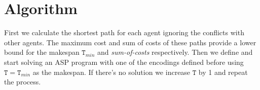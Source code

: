 






\section{Algorithm}
First we calculate the shortest path for each agent ignoring the conflicts with other agents. The maximum cost and sum of costs of these paths provide a lower bound for the makespan $\mathtt{T}_{min}$ and \emph{sum-of-costs} respectively. Then we define and start solving an ASP program with one of the encodings defined before using $\mathtt{T}=\mathtt{T}_{min}$ as the makespan. If there's no solution we increase $\mathtt{T}$ by 1 and repeat the process.

